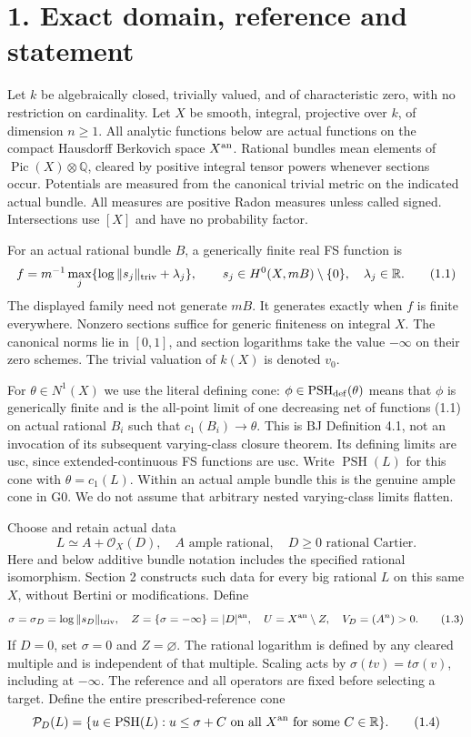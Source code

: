 \documentclass[
  10pt,
]{article}
\begin{document}
\section{1. Exact domain, reference and
statement}\label{exact-domain-reference-and-statement}

Let \(k\) be algebraically closed, trivially valued, and of
characteristic zero, with no restriction on cardinality. Let \(X\) be
smooth, integral, projective over \(k\), of dimension \(n\geq1\). All
analytic functions below are actual functions on the compact Hausdorff
Berkovich space \(X^{\rm an}\). Rational bundles mean elements of
\(\operatorname{Pic}(X)\otimes\mathbb Q\), cleared by positive integral
tensor powers whenever sections occur. Potentials are measured from the
canonical trivial metric on the indicated actual bundle. All measures
are positive Radon measures unless called signed. Intersections use
\([X]\) and have no probability factor.

For an actual rational bundle \(B\), a generically finite real FS
function is \[f=m^{-1}\max_j\{\log\|s_j\|_{\rm triv}+\lambda_j\},\qquad
s_j\in H^0(X,mB)\setminus\{0\},\quad\lambda_j\in\mathbb R.\tag{1.1}\]
The displayed family need not generate \(mB\). It generates exactly when
\(f\) is finite everywhere. Nonzero sections suffice for generic
finiteness on integral \(X\). The canonical norms lie in \([0,1]\), and
section logarithms take the value \(-\infty\) on their zero schemes. The
trivial valuation of \(k(X)\) is denoted \(v_0\).

For \(\theta\in N^1(X)\) we use the literal defining cone:
\(\phi\in\operatorname{PSH}_{\rm def}(\theta)\) means that \(\phi\) is
generically finite and is the all-point limit of one decreasing net of
functions (1.1) on actual rational \(B_i\) such that
\(c_1(B_i)\to\theta\). This is BJ Definition 4.1, not an invocation of
its subsequent varying-class closure theorem. Its defining limits are
usc, since extended-continuous FS functions are usc. Write
\(\operatorname{PSH}(L)\) for this cone with \(\theta=c_1(L)\). Within
an actual ample bundle this is the genuine ample cone in G0. We do not
assume that arbitrary nested varying-class limits flatten.

Choose and retain actual data
\[L\simeq A+\mathcal O_X(D),\quad A\text{ ample rational},\quad D\geq0\text{ rational Cartier}.\tag{1.2}\]
Here and below additive bundle notation includes the specified rational
isomorphism. Section 2 constructs such data for every big rational \(L\)
on this same \(X\), without Bertini or modifications. Define
\[\sigma=\sigma_D=\log\|s_D\|_{\rm triv},\quad
Z=\{\sigma=-\infty\}=|D|^{\rm an},\quad U=X^{\rm an}\setminus Z,\quad V_D=(A^n)>0.\tag{1.3}\]
If \(D=0\), set \(\sigma=0\) and \(Z=\varnothing\). The rational
logarithm is defined by any cleared multiple and is independent of that
multiple. Scaling acts by \(\sigma(tv)=t\sigma(v)\), including at
\(-\infty\). The reference and all operators are fixed before selecting
a target. Define the entire prescribed-reference cone
\[\mathcal P_D(L)=\{u\in\operatorname{PSH}(L):u\leq\sigma+C
\text{ on all }X^{\rm an}\text{ for some }C\in\mathbb R\}.\tag{1.4}\]
\end{document}
